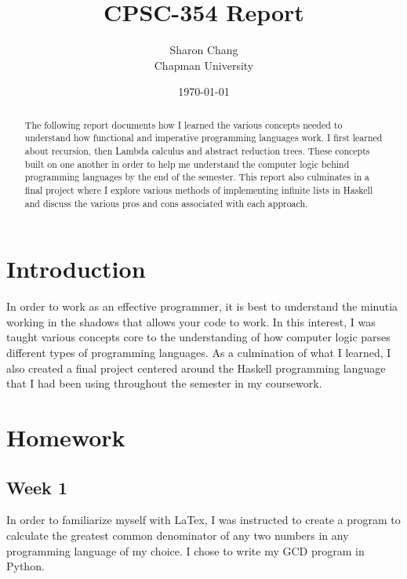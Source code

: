 \documentclass{article}
\title{CPSC-354 Report}
\author{Sharon Chang  \\ Chapman University}
\date{\today}
\theoremstyle{theorem}
\theoremstyle{definition}
\theoremstyle{remark}
\begin{document}
\maketitle

\begin{abstract}
The following report documents how I learned the various concepts needed to understand how functional and imperative programming languages work. I first learned about recursion, then Lambda calculus and abstract reduction trees. These concepts built on one another in order to help me understand the computer logic behind programming languages by the end of the semester. This report also culminates in a final project where I explore various methods of implementing infinite lists in Haskell and discuss the various pros and cons associated with each approach.
\end{abstract}

\tableofcontents

\section{Introduction}\label{intro}
In order to work as an effective programmer, it is best to understand the minutia working in the shadows that allows your code to work. In this interest, I was taught various concepts core to the understanding of how computer logic parses different types of programming languages. As a culmination of what I learned, I also created a final project centered around the Haskell programming language that I had been using throughout the semester in my coursework.

\section{Homework}\label{homework}


\subsection{Week 1}

In order to familiarize myself with LaTex, I was instructed to create a program to calculate the greatest common denominator of any two numbers in any programming language of my choice. I chose to write my GCD program in Python.
\end{document}
